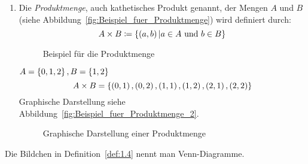 \begin{definition}[Mengenoperationen]
\begin{enumerate}
\item Die \emph{Produktmenge}, auch kathetisches Produkt genannt, der Mengen $A$ und $B$ (siehe Abbildung~\vref{fig:Beispiel_fuer_Produktmenge}) wird definiert durch:
	\[A \times B \mathrel{\mathop:\!\!=} \left\{\left(a, b\right) \vert a \in A \text{ und } b \in B\right\}\]
	\begin{figure}[htb]
	\centering
	
	\caption{Beispiel für die Produktmenge}
	\label{fig:Beispiel_fuer_Produktmenge}
	\end{figure}
	\begin{example}
	$A = \left\{0, 1, 2\right\}, B = \left\{1, 2\right\}$
	\[A \times B = \left\{\left(0,1\right), \left(0,2\right), \left(1,1\right), \left(1,2\right), \left(2,1\right), \left(2,2\right)\right\}\]
	Graphische Darstellung siehe Abbildung~\vref{fig:Beispiel_fuer_Produktmenge_2}.
	\begin{figure}[htb]
	\centering
	
	\caption{Graphische Darstellung einer Produktmenge}
	\label{fig:Beispiel_fuer_Produktmenge_2}
	\end{figure}
	\end{example}
\end{enumerate}

\label{def:1.4}
\end{definition}

\begin{note}
Die Bildchen in Definition~\vref{def:1.4} nennt man Venn-Diagramme.
\end{note}

